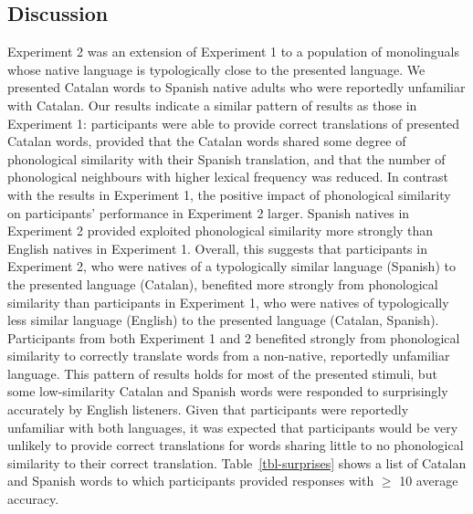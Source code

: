 \documentclass[
]{article}
\begin{document}
\subsection{Discussion}\label{discussion-1}

Experiment 2 was an extension of Experiment 1 to a population of
monolinguals whose native language is typologically close to the
presented language. We presented Catalan words to Spanish native adults
who were reportedly unfamiliar with Catalan. Our results indicate a
similar pattern of results as those in Experiment 1: participants were
able to provide correct translations of presented Catalan words,
provided that the Catalan words shared some degree of phonological
similarity with their Spanish translation, and that the number of
phonological neighbours with higher lexical frequency was reduced. In
contrast with the results in Experiment 1, the positive impact of
phonological similarity on participants' performance in Experiment 2
larger. Spanish natives in Experiment 2 provided exploited phonological
similarity more strongly than English natives in Experiment 1. Overall,
this suggests that participants in Experiment 2, who were natives of a
typologically similar language (Spanish) to the presented language
(Catalan), benefited more strongly from phonological similarity than
participants in Experiment 1, who were natives of typologically less
similar language (English) to the presented language (Catalan, Spanish).
Participants from both Experiment 1 and 2 benefited strongly from
phonological similarity to correctly translate words from a non-native,
reportedly unfamiliar language. This pattern of results holds for most
of the presented stimuli, but some low-similarity Catalan and Spanish
words were responded to surprisingly accurately by English listeners.
Given that participants were reportedly unfamiliar with both languages,
it was expected that participants would be very unlikely to provide
correct translations for words sharing little to no phonological
similarity to their correct translation. Table~\ref{tbl-surprises} shows
a list of Catalan and Spanish words to which participants provided
responses with \(\geq\) 10 average accuracy.
\end{document}
